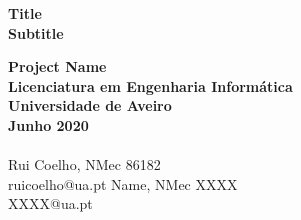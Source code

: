 \thispagestyle{empty}
\vspace*{\fill}
\sffamily

\Large{
\noindent
\textbf{Title}\\
\textbf{Subtitle}\\
}

\small
\noindent
\textbf{Project Name}\\
\textbf{Licenciatura em Engenharia Informática}\\
\textbf{Universidade de Aveiro}\\
\textbf{Junho 2020}\\
\\
Rui Coelho, NMec 86182\\
ruicoelho@ua.pt
Name, NMec XXXX\\
XXXX@ua.pt
\normalsize
\normalfont
\vspace*{2.5cm}
